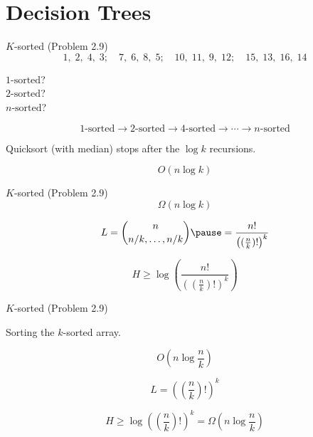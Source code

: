 \section{Decision Trees}

\begin{frame}{$K$-sorted (Problem 2.9)}
  \[
	1,\;2,\;4,\;3;\quad 7,\;6,\;8,\;5;\quad 10,\;11,\;9,\;12;\quad 15,\;13,\;16,\;14
  \]

  \pause
  \vspace{0.20cm}

  \begin{center}
	$1\text{-sorted}$? \\ \pause
	$2\text{-sorted}$? \\ \pause
	$n\text{-sorted}$?
  \end{center}

  \pause
  \[
	1\text{-sorted} \to 2\text{-sorted} \to 4\text{-sorted} \to \cdots \to n\text{-sorted}
  \]

  \pause
  \centerline{Quicksort (with median) stops after the $\log k$ recursions.}

  \pause
  \[
	O(n \log k)
  \]
\end{frame}
\begin{frame}{$K$-sorted (Problem 2.9)}
  \[
    \Omega(n \log k)
  \]

  \pause
  \[
	L = \binom{n}{n/k, \ldots, n/k} \pause = \frac{n!}{\left( (\frac{n}{k})! \right)^{k}}
  \]

  \pause
  \[
	H \ge \log \left(\frac{n!}{\left( (\frac{n}{k})! \right)^{k}} \right)
  \]
\end{frame}
\begin{frame}{$K$-sorted (Problem 2.9)}
  \centerline{Sorting the $k$-sorted array.}

  \pause
  \[
	O(n \log \frac{n}{k})
  \]

  \pause
  \[
	L = ((\frac{n}{k})!)^k
  \]

  \pause
  \[
	H \ge \log ((\frac{n}{k})!)^k = \Omega(n \log \frac{n}{k})
  \]
\end{frame}
